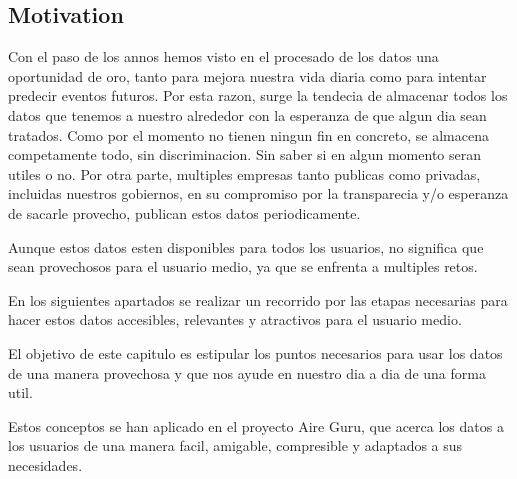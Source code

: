 \subsection*{Motivation}
Con el paso de los annos hemos visto en el procesado de los datos una oportunidad de oro, 
tanto para mejora nuestra vida diaria como para intentar predecir
eventos futuros. Por esta razon, surge la tendecia de almacenar todos los datos que tenemos 
a nuestro alrededor con la esperanza de que algun dia sean tratados.
Como por el momento no tienen ningun fin en concreto, se almacena competamente todo, sin discriminacion.
Sin saber si en algun momento seran utiles o no.
Por otra parte, multiples empresas tanto publicas como privadas, incluidas nuestros gobiernos, 
en su compromiso por la transparecia y/o esperanza de sacarle provecho, publican estos datos periodicamente.

Aunque estos datos esten disponibles para todos los usuarios, no significa que sean provechosos para el 
usuario medio, ya que se enfrenta a multiples retos.

En los siguientes apartados se realizar un recorrido por las etapas necesarias para hacer estos datos
accesibles, relevantes y atractivos para el usuario medio.

El objetivo de este capitulo es estipular los puntos necesarios para usar los datos de una manera provechosa y
que nos ayude en nuestro dia a dia de una forma util.

Estos conceptos se han aplicado en el proyecto Aire Guru, que acerca los datos a los usuarios de una manera
facil, amigable, compresible y adaptados a sus necesidades.


